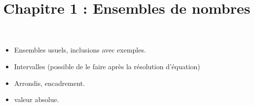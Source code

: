 \documentclass{coursclass}
\title{Chapitre 1 : Ensembles de nombres}
\date{}
\author{}
\begin{document}
\maketitle

\begin{itemize}
	\item Ensembles usuels, inclusions avec exemples.
	\item Intervalles (possible de le faire après la résolution d'équation)
	\item Arrondis, encadrement.
	\item valeur absolue.
\end{itemize}
\end{document}
